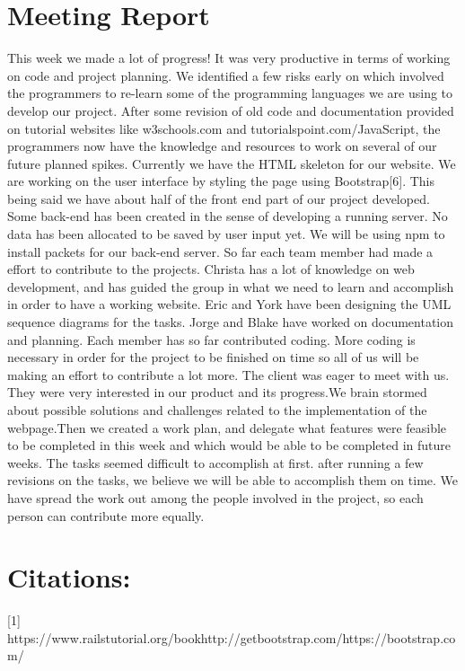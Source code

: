 \documentclass[a4paper]{article}
\begin{document}
\section{Meeting Report}
This week we made a lot of progress! It was very productive in terms of working on code and project planning. We identified a few risks early on which involved the programmers to re-learn some of the programming languages we are using to develop our project. After some revision of old code and documentation provided on tutorial websites like w3schools.com and tutorialspoint.com/JavaScript, the programmers now have the knowledge and resources to work on several of our future planned spikes. 
\newline
\newline
Currently we have the HTML skeleton for our website. We are working on the user interface by styling the page using Bootstrap[6]. This being said we have about half of the front end part of our project developed. Some back-end has been created in the sense of developing a running server. No data has been allocated to be saved by user input yet. We will be using npm to install packets for our back-end server. 
\newline
\newline
So far each team member had made a effort to contribute to the projects. Christa has a lot of knowledge on web development, and has guided the group in what we need to learn and accomplish in order to have a working website. Eric and York have been designing the UML sequence diagrams for the tasks. Jorge and Blake have worked on documentation and planning. Each member has so far contributed coding. More coding is necessary in order for the project to be finished on time so all of us will be making an effort to contribute a lot more. 
\newline
\newline
The client was eager to meet with us. They were very interested in our product and its progress.We brain stormed about possible solutions and challenges related to the implementation of the webpage.Then we created a work plan, and delegate what features were feasible to be completed in this week and which would be able to be completed in future weeks.   
\newline
\newline
The tasks seemed difficult to accomplish at first. after running a few revisions on the tasks, we believe we will be able to accomplish them on time. We have spread the work out among the people involved in the project, so each person can contribute more equally.
\pagebreak
\section{Citations: }
[1] {https://www.railstutorial.org/book}\newline
[5] http://getbootstrap.com/\newline
[6]https://bootstrap.com/
\end{document}

